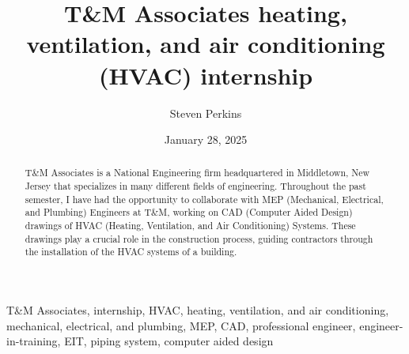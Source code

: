 ﻿\documentclass[12pt,conference,onecolumn]{IEEEtran}
\title{T\&M Associates heating, ventilation, and air conditioning (HVAC) internship}
\author{Steven Perkins}
\date{January 28, 2025}
\newcommand{\keywords}{T\&M Associates, internship, HVAC, heating, ventilation, and air conditioning, mechanical, electrical, and plumbing, MEP, CAD, professional engineer, engineer-in-training, EIT, piping system, computer aided design}
\begin{document}
\maketitle 

\begin{abstract}
T\&M Associates is a National Engineering firm headquartered in Middletown, New Jersey that specializes in many different fields of engineering. Throughout the past semester, I have had the opportunity to collaborate with MEP (Mechanical, Electrical, and Plumbing) Engineers at T\&M, working on CAD (Computer Aided Design) drawings of HVAC (Heating, Ventilation, and Air Conditioning) Systems. These drawings play a crucial role in the construction process, guiding contractors through the installation of the HVAC systems of a building.
\end{abstract}

\begin{IEEEkeywords}
\keywords
\end{IEEEkeywords}
\end{document}

